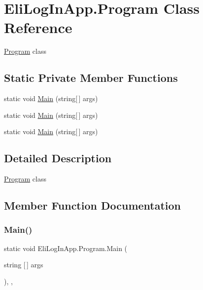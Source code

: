 \hypertarget{class_eli_log_in_app_1_1_program}{}\section{Eli\+Log\+In\+App.\+Program Class Reference}
\label{class_eli_log_in_app_1_1_program}


\hyperlink{class_eli_log_in_app_1_1_program}{Program} class  


\subsection*{Static Private Member Functions}
\begin{DoxyCompactItemize}
\item 
static void \hyperlink{class_eli_log_in_app_1_1_program_a858eac5e1cab1f27b9acac42228d699f}{Main} (string\mbox{[}$\,$\mbox{]} args)
\item 
static void \hyperlink{class_eli_log_in_app_1_1_program_a858eac5e1cab1f27b9acac42228d699f}{Main} (string\mbox{[}$\,$\mbox{]} args)
\item 
static void \hyperlink{class_eli_log_in_app_1_1_program_a858eac5e1cab1f27b9acac42228d699f}{Main} (string\mbox{[}$\,$\mbox{]} args)
\end{DoxyCompactItemize}


\subsection{Detailed Description}
\hyperlink{class_eli_log_in_app_1_1_program}{Program} class 



\subsection{Member Function Documentation}
\mbox{\label{class_eli_log_in_app_1_1_program_a858eac5e1cab1f27b9acac42228d699f}} 
\subsubsection{\texorpdfstring{Main()}{Main()}\hspace{0.1cm}{\footnotesize\ttfamily [1/3]}}
{\footnotesize\ttfamily static void Eli\+Log\+In\+App.\+Program.\+Main (\begin{DoxyParamCaption}\item[{string \mbox{[}$\,$\mbox{]}}]{args }\end{DoxyParamCaption})\hspace{0.3cm}{\ttfamily [inline]}, {\ttfamily [static]}, {\ttfamily [private]}}

